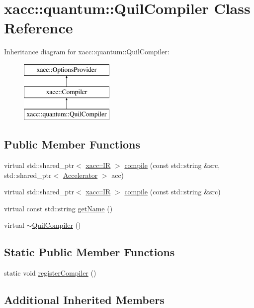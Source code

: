 \hypertarget{a01204}{}\section{xacc\+:\+:quantum\+:\+:Quil\+Compiler Class Reference}
\label{a01204}
Inheritance diagram for xacc\+:\+:quantum\+:\+:Quil\+Compiler\+:\begin{figure}[H]
\begin{center}
\leavevmode
\includegraphics[height=3.000000cm]{a01204}
\end{center}
\end{figure}
\subsection*{Public Member Functions}
\begin{DoxyCompactItemize}
\item 
virtual std\+::shared\+\_\+ptr$<$ \hyperlink{a02480}{xacc\+::\+IR} $>$ \hyperlink{a01204_a2421482415ca4e09963ea4ecddff8100}{compile} (const std\+::string \&src, std\+::shared\+\_\+ptr$<$ \hyperlink{a02432}{Accelerator} $>$ acc)
\item 
virtual std\+::shared\+\_\+ptr$<$ \hyperlink{a02480}{xacc\+::\+IR} $>$ \hyperlink{a01204_adf4d321ecb0df3fa7728999f941c83b2}{compile} (const std\+::string \&src)
\item 
virtual const std\+::string \hyperlink{a01204_ae7d52140b6dd52730edc6e38ae48f437}{get\+Name} ()
\item 
virtual \hyperlink{a01204_a0866a9f695f28c90ac1f4754374f3bfe}{$\sim$\+Quil\+Compiler} ()
\end{DoxyCompactItemize}
\subsection*{Static Public Member Functions}
\begin{DoxyCompactItemize}
\item 
static void \hyperlink{a01204_aaec99a14bede717bf02a0f65af2a3c69}{register\+Compiler} ()
\end{DoxyCompactItemize}
\subsection*{Additional Inherited Members}


